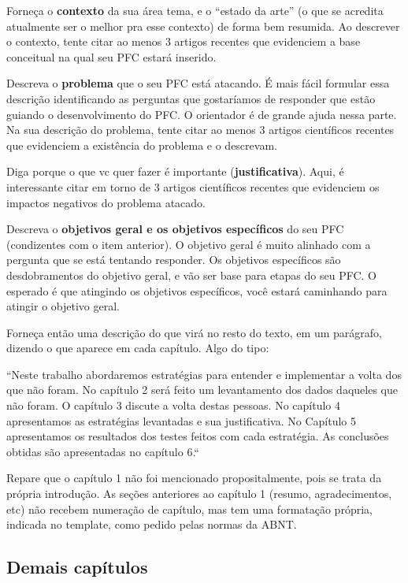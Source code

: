 \begin{outline}
\1 Forneça o \textbf{contexto} da sua área tema, e o “estado da arte” (o que se acredita atualmente ser o melhor pra esse contexto) de forma bem resumida. Ao descrever o contexto, tente citar ao menos 3 artigos recentes que evidenciem a base conceitual na qual seu PFC estará inserido.

\1 Descreva o \textbf{problema} que o seu PFC está atacando. É mais fácil formular essa descrição identificando as perguntas que gostaríamos de responder que estão guiando o desenvolvimento do PFC. O orientador é de grande ajuda nessa parte. Na sua descrição do problema, tente citar ao menos 3 artigos científicos recentes que evidenciem a existência do problema e o descrevam.

\1 Diga porque o que vc quer fazer é importante (\textbf{justificativa}). Aqui, é interessante citar em torno de 3 artigos científicos recentes que evidenciem os impactos negativos do problema atacado.

\1 Descreva o \textbf{objetivos geral e os objetivos específicos} do seu PFC (condizentes com o item anterior). O objetivo geral é muito alinhado com a pergunta que se está tentando responder. Os objetivos específicos são desdobramentos do objetivo geral, e vão ser base para etapas do seu PFC. O esperado é que atingindo os objetivos específicos, você estará caminhando para atingir o objetivo geral.

\1 Forneça então uma descrição do que virá no resto do texto, em um parágrafo, dizendo o que aparece em cada capítulo. Algo do tipo:

\2 “Neste trabalho abordaremos estratégias para entender e implementar a volta dos que não foram. No capítulo 2 será feito um levantamento dos dados daqueles que não foram. O capítulo 3 discute a volta destas pessoas. No capítulo 4 apresentamos as estratégias levantadas e sua justificativa. No Capítulo 5 apresentamos os resultados dos testes feitos com cada estratégia. As conclusões obtidas são apresentadas no capítulo 6.“
\end{outline}

Repare que o capítulo 1 não foi mencionado propositalmente, pois se trata da própria introdução. As seções anteriores ao capítulo 1 (resumo, agradecimentos, etc) não recebem numeração de capítulo, mas tem uma formatação própria, indicada no template, como pedido pelas normas da ABNT.


\subsection{Demais capítulos}

